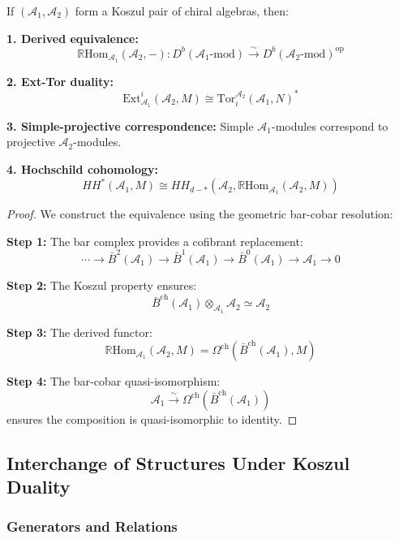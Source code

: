 \begin{theorem}
If $(\mathcal{A}_1, \mathcal{A}_2)$ form a Koszul pair of chiral algebras, then:

\textbf{1. Derived equivalence:}
$$\mathbb{R}\text{Hom}_{\mathcal{A}_1}(\mathcal{A}_2, -): D^b(\mathcal{A}_1\text{-mod}) \xrightarrow{\sim} D^b(\mathcal{A}_2\text{-mod})^{\text{op}}$$

\textbf{2. Ext-Tor duality:}
$$\text{Ext}^i_{\mathcal{A}_1}(\mathcal{A}_2, M) \cong \text{Tor}_i^{\mathcal{A}_2}(\mathcal{A}_1, N)^*$$

\textbf{3. Simple-projective correspondence:}
Simple $\mathcal{A}_1$-modules correspond to projective $\mathcal{A}_2$-modules.

\textbf{4. Hochschild cohomology:}
$$HH^*(\mathcal{A}_1, M) \cong HH_{d-*}(\mathcal{A}_2, \mathbb{R}\text{Hom}_{\mathcal{A}_1}(\mathcal{A}_2, M))$$
\end{theorem}

\begin{proof}
We construct the equivalence using the geometric bar-cobar resolution:

\textbf{Step 1:} The bar complex provides a cofibrant replacement:
$$\cdots \to \bar{B}^2(\mathcal{A}_1) \to \bar{B}^1(\mathcal{A}_1) \to \bar{B}^0(\mathcal{A}_1) \to \mathcal{A}_1 \to 0$$

\textbf{Step 2:} The Koszul property ensures:
$$\bar{B}^{\text{ch}}(\mathcal{A}_1) \otimes_{\mathcal{A}_1} \mathcal{A}_2 \simeq \mathcal{A}_2$$

\textbf{Step 3:} The derived functor:
$$\mathbb{R}\text{Hom}_{\mathcal{A}_1}(\mathcal{A}_2, M) = \Omega^{\text{ch}}(\bar{B}^{\text{ch}}(\mathcal{A}_1), M)$$

\textbf{Step 4:} The bar-cobar quasi-isomorphism:
$$\mathcal{A}_1 \xrightarrow{\sim} \Omega^{\text{ch}}(\bar{B}^{\text{ch}}(\mathcal{A}_1))$$
ensures the composition is quasi-isomorphic to identity.
\end{proof}


\subsection{Interchange of Structures Under Koszul Duality}

\subsubsection{Generators and Relations}

